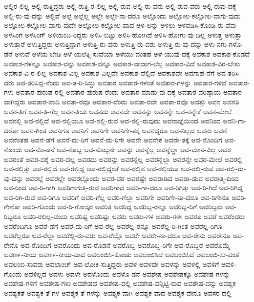 {ಅಲ್ಲಿರ-ಲಿಲ್ಲ
ಅಲ್ಲಿ-ರುತ್ತಿದ್ದರು
ಅಲ್ಲಿ-ರುತ್ತಿ-ರ-ಲಿಲ್ಲ
ಅಲ್ಲಿ-ರುವ
ಅಲ್ಲಿ-ರು-ವನು
ಅಲ್ಲಿ-ರುವ-ವರು
ಅಲ್ಲಿ-ರುವು-ದಕ್ಕೆ
ಅಲ್ಲಿ-ರು-ವು-ದನ್ನು
ಅಲ್ಲಿವೆ
ಅಲ್ಲೆ
ಅಲ್ಲೆಲ್ಲ
ಅಲ್ಲೇ
ಅಲ್ಲೇ-ನಾ-ದರೂ
ಅಲ್ಲೊಂದು
ಅಲ್ಲೋಲ-ಕಲ್ಲೋಲ-ವಾಗು-ವುದು
ಅಲ್ಲೋಲ-ಕಲ್ಲೋಲ-ವಾಗು-ವುದೇ
ಅಲ್ಲೋಲ-ಕಲ್ಲೋಲ-ವಾದ
ಅಳ-ಲನ್ನು
ಅಳಲು
ಅಳವಡಿಸಿ-ಕೊಂಡಿ-ರು-ವೆವು
ಅಳಸಿಂಗ
ಅಳಸಿಂಗ್
ಅಳಿಯಂದಿ-ರಿದ್ದರು
ಅಳಿಸಿ-ಬಿಟ್ಟು
ಅಳಿಸಿ-ಹೋಗಿದೆ
ಅಳಿಸಿ-ಹೋಗು-ವು-ದಿಲ್ಲ
ಅಳುತ್ತ
ಅಳುತ್ತಾ
ಅಳುತ್ತಾರೆ
ಅಳುತ್ತಿದ್ದರು
ಅಳುತ್ತಿದ್ದಾಗ
ಅಳುತ್ತಿ-ರು-ವನು
ಅಳುತ್ತಿ-ರು-ವರು
ಅಳುತ್ತಿ-ರು-ವು-ದನ್ನು
ಅಳು-ನಗು-ಗಳೊ-ಡನೆ
ಅಳುವೆ
ಅಳೆಯ-ಬೇಡಿ
ಅಳೆ-ಯಲೆತ್ನಿ-ಸುವೆಯಾ
ಅಳೆಯು-ವಂತಹ
ಅಳೆ-ಯುವು-ದಕ್ಕೆ
ಅವಕಾಶ
ಅವಕಾಶ-ಕೊಡದೆ
ಅವಕಾಶ-ಗಳನ್ನೂ
ಅವಕಾಶ-ವನ್ನು
ಅವಕಾಶ-ವನ್ನೂ
ಅವಕಾಶ-ವಾದಾಗ-ಲೆಲ್ಲ
ಅವಕಾಶ-ವಿದೆ
ಅವಕಾಶ-ವಿರ-ಬೇಕು
ಅವಕಾಶ-ವಿ-ರ-ಲಿಲ್ಲ
ಅವಕಾಶ-ವಿಲ್ಲ
ಅವಕಾಶ-ವಿಲ್ಲದೇ
ಅವಕಾಶ-ವೆಲ್ಲಿದೆ
ಅವಕಾಶವೇ
ಅವಗಾಹ-ನೆಗೆ
ಅವ-ತರಿಸಿ-ದರು
ಅವ-ತರಿಸಿದ್ದ-ನೆಂದು
ಅವ-ತ-ರಿ-ಸಿದ್ದು
ಅವತಾರ
ಅವತಾರ-ಗಳಂತೆ
ಅವತಾರ-ಗಳನ್ನು
ಅವತಾರ-ಗಳಿವೆ
ಅವತಾರ-ಗಳು
ಅವತಾರ-ಪುರುಷ-ರಲ್ಲಿ
ಅವತಾರ-ಪುರುಷ-ರೆಂದು
ಅವತಾರ-ಮಾಡು-ವು-ದಕ್ಕೆ
ಅವತಾರ-ವರಿಷ್ಠಾಯ
ಅವತಾರ-ವಾಗಿದ್ದರು
ಅವತಾರ-ವಾದಿ
ಅವತಾ-ರವೂ
ಅವತಾರ-ವೆಂದು
ಅವತಾ-ರವೇ
ಅವತಾ-ರವೊ
ಅವತ್ತು
ಅವನ
ಅವನತಿ
ಅವನ-ತಿಗೆ
ಅವನ-ತಿ-ಗೆಲ್ಲ
ಅವನ-ತಿಯ
ಅವನದು
ಅವನದೇ
ಅವನನ್ನು
ಅವನನ್ನೇ
ಅವ-ನನ್ನೇಕೆ
ಅವನ-ಮೇಲೆ
ಅವನಲ್ಲಿ
ಅವ-ನಲ್ಲಿದೆ
ಅವ-ನಲ್ಲಿಯೂ
ಅವ-ನಲ್ಲಿ-ರುವ
ಅವ-ನಲ್ಲಿ-ರುವುದು
ಅವನಾಜ್ಞೆಯಿಂದ
ಅವನಿಂದ
ಅವನಿ-ಗಾ-ದರೋ
ಅವನಿ-ಗಿಂತ
ಅವನಿಗೂ
ಅವನಿಗೆ
ಅವನಿಗೇ
ಅವನಿಗೇ-ತಕ್ಕೆ
ಅವನಿದ್ದರೂ
ಅವ-ನಿಲ್ಲದ
ಅವನು
ಅವನೆ
ಅವನೆಂತಹ
ಅವನೆ-ಡೆಗೆ
ಅವನೆ-ದು-ರಿಗೆ
ಅವನೆ-ದು-ರಿಗೇ
ಅವನೇ
ಅವನೇಕೆ
ಅವನೇ-ತಕ್ಕೆ
ಅವ-ನೊಂದಿಗೆ
ಅವ-ನೊಂದು
ಅವ-ನೊ-ಡನೆ
ಅವ-ನೊಬ್ಬ
ಅವ-ನೊಬ್ಬನೇ
ಅವನ್ನು
ಅವನ್ನೆಲ್ಲ
ಅವನ್ನೆಲ್ಲಾ
ಅವ-ಮಾನ-ವಿಲ್ಲ
ಅವರ
ಅವರಂತೆ
ಅವರ-ದಕ್ಕೆ
ಅವರ-ದಲ್ಲ
ಅವರದು
ಅವರನ್ನು
ಅವರನ್ನೆಲ್ಲ
ಅವರನ್ನೆಲ್ಲಾ
ಅವರನ್ನೇ
ಅವರ-ಮೇಲೆ
ಅವರಲ್ಲಿ
ಅವ-ರಲ್ಲಿತ್ತು
ಅವ-ರಲ್ಲಿದೆ
ಅವ-ರಲ್ಲಿದ್ದ
ಅವ-ರಲ್ಲಿದ್ದಂತೆ
ಅವ-ರಲ್ಲಿನ
ಅವ-ರಲ್ಲಿಯೂ
ಅವ-ರಲ್ಲಿ-ರುವ
ಅವ-ರಲ್ಲಿ-ರು-ವು-ದನ್ನು
ಅವರಲ್ಲೆ
ಅವರಲ್ಲೇ
ಅವರಲ್ಲೊಂದು
ಅವರ-ವರ
ಅವರಷ್ಟೇ
ಅವರಾಡಿದ
ಅವರಾ-ಡುವ
ಅವರಾತ್ಮ-ದಿಂದ
ಅವ-ರಿಂದ
ಅವ-ರಿ-ಗಾಗಿ
ಅವರಿಗಾಗುತ್ತಿ-ರುವ
ಅವರಿಗಾದ
ಅವರಿ-ಗಾ-ದರೂ
ಅವ-ರಿಗಿತ್ತು
ಅವ-ರಿ-ಗಿದೆ
ಅವ-ರಿಗಿದ್ದ
ಅವ-ರಿಗಿ-ರುವ
ಅವ-ರಿಗೂ
ಅವರಿಗೆ
ಅವರಿ-ಗೆಲ್ಲ
ಅವರಿ-ಗೆಲ್ಲಾ
ಅವರಿಗೇ
ಅವರಿಗೇ-ನಾ-ದರೂ
ಅವ-ರಿಗೇನೂ
ಅವರಿ-ಗೇನೋ
ಅವರಿ-ಗೊಂದು
ಅವ-ರಿ-ಗೋಸ್ಕರ
ಅವರಿತ್ತ
ಅವರಿದ್ದ
ಅವರಿಬ್ಬ-ರನ್ನೂ
ಅವರಿಬ್ಬ-ರಿಗೆ
ಅವರಿಬ್ಬರು
ಅವ-ರಿಬ್ಬರೂ
ಅವರಿ-ರಲಿಲ್ಲ-ವೆಂದು
ಅವರಿಷ್ಟ
ಅವರಿಷ್ಟು
ಅವರು
ಅವರು-ಗಳ
ಅವರು-ಗಳೇ
ಅವರೂ
ಅವರೆ
ಅವರೆಂದರು
ಅವರೆಂದಿಗೂ
ಅವರೆ-ಡೆಗೆ
ಅವರೆ-ದು-ರಿಗೆ
ಅವ-ರೆಲ್ಲ
ಅವರೆಲ್ಲ-ರನ್ನೂ
ಅವರೆಲ್ಲ-ರಿ-ಗಿಂತ
ಅವರೆಲ್ಲ-ರಿಗೂ
ಅವರೆಲ್ಲರೂ
ಅವ-ರೆಲ್ಲಾ
ಅವರೆಲ್ಲಿ-ರು-ವರು
ಅವ-ರೆಲ್ಲೊ
ಅವರೇ
ಅವರೇ-ನಾ-ದರೂ
ಅವ-ರೇನು
ಅವರೇನೂ
ಅವ-ರೇನೊ
ಅವ-ರೊಂದಿಗೆ
ಅವರೊಂದು
ಅವ-ರೊಡನೆ
ಅವರೊಬ್ಬ
ಅವರೊಬ್ಬ-ರಿಗೇ
ಅವ-ರೊಬ್ಬರೆ
ಅವರೊಮ್ಮೆ
ಅವರ್ಣ-ನೀಯ
ಅವರ್ಣ-ನೀಯ-ವಾದ
ಅವಲಂಬಿಸಿ-ಕೊಂಡು
ಅವಲಂಬಿಸಿದ
ಅವಲಂಬಿಸಿದೆ
ಅವಲಂಬಿ-ಸು-ವಂತೆ
ಅವಲಂಬಿ-ಸುವರು
ಅವಲಾಂಚ್
ಅವ-ಲೋಕಿ-ಸುತ್ತಿದ್ದರು
ಅವಳ
ಅವಳದೇ
ಅವಳನ್ನು
ಅವಳಲ್ಲಿ
ಅವಳಿಗೆ
ಅವಳಿ-ಗೊಂದು
ಅವಳಿಲ್ಲದ
ಅವಳು
ಅವಳೇ
ಅವಳೊಂದು
ಅವಳೊ-ಡನೆ
ಅವಶೇಷ
ಅವಶೇಷಕ್ಕೂ
ಅವಶೇಷ-ಗಳನ್ನು
ಅವಶೇಷ-ಗಳಿಗೆ
ಅವಶೇಷ-ಗಳು
ಅವಶೇಷದ
ಅವಶೇಷ-ದಲ್ಲಿ
ಅವಶೇಷ-ವನ್ನಿಟ್ಟಿ-ರುವ
ಅವಶೇಷ-ವನ್ನು
ಅವಶ್ಯಕ
ಅವಶ್ಯಕತೆ
ಅವಶ್ಯಕ-ತೆ-ಗಳ
ಅವಶ್ಯಕ-ತೆ-ಗಳನ್ನು
ಅವಶ್ಯಕ-ವಾಗಿ
ಅವಶ್ಯಕ-ವಾದ
ಅವಶ್ಯಕ-ವೇನೂ
ಅವಸರ-ದಲ್ಲಿ
}
